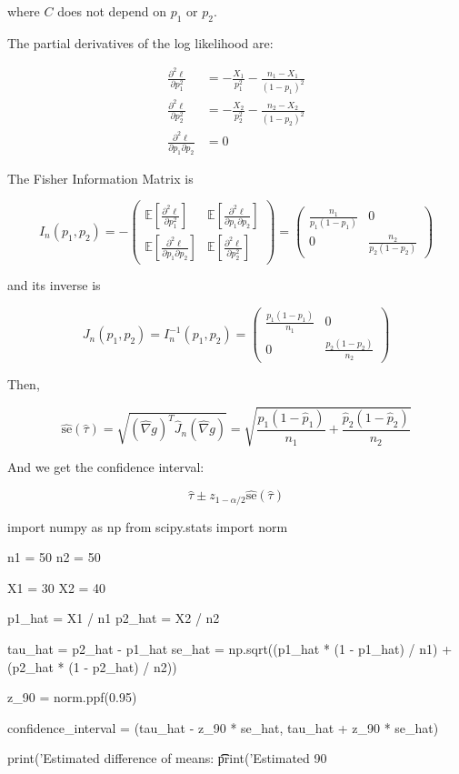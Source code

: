 where \(C\) does not depend on \(p_{1}\) or \(p_{2}\).

The partial derivatives of the log likelihood are:

\begin{align*}
\frac{\partial^{2} \ell}{\partial p_{1}^{2}} & = - \frac{X_{1}}{p_{1}^{2}} - \frac{n_{1} - X_{1}}{(1 - p_{1})^{2}} \\
\frac{\partial^{2} \ell}{\partial p_{2}^{2}} & = - \frac{X_{2}}{p_{2}^{2}} - \frac{n_{2} - X_{2}}{(1 - p_{2})^{2}} \\
\frac{\partial^{2} \ell}{\partial p_{1} \partial p_{2}} & = 0
\end{align*}

The Fisher Information Matrix is

\[ I_{n}(p_{1}, p_{2}) = -\begin{pmatrix}
\mathbb{E}\left[ \frac{\partial^{2} \ell}{\partial p_{1}^{2}} \right]
& \mathbb{E}\left[ \frac{\partial^{2} \ell}{\partial p_{1} \partial p_{2}} \right]  \\
\mathbb{E}\left[ \frac{\partial^{2} \ell}{\partial p_{1} \partial p_{2}} \right]
& \mathbb{E}\left[ \frac{\partial^{2} \ell}{\partial p_{2}^{2}} \right]
\end{pmatrix} = \begin{pmatrix}
\frac{n_{1}}{p_{1}(1 - p_{1})} & 0 \\
0 & \frac{n_{2}}{p_{2}(1 - p_{2})}
\end{pmatrix}\]

and its inverse is

\[J_{n}(p_{1}, p_{2}) = I_{n}^{-1}(p_{1}, p_{2}) = \begin{pmatrix} 
\frac{p_{1}(1 - p_{1})}{n_{1}} & 0 \\
0 & \frac{p_{2}(1 - p_{2})}{n_{2}}
\end{pmatrix}\]

Then,

\[\hat{\text{se}}(\hat{\tau}) = \sqrt{(\hat{\nabla}g)^T \hat{J}_{n} (\hat{\nabla}g)}
= \sqrt{\frac{\hat{p}_{1}(1 - \hat{p}_{1})}{n_{1}} + \frac{\hat{p}_{2}(1 - \hat{p}_{2})}{n_{2}}}
\]

And we get the confidence interval:

\[ \hat{\tau} \pm z_{1 - \alpha/2}\hat{\text{se}}(\hat{\tau})\]

\begin{python}
import numpy as np
from scipy.stats import norm

n1 = 50
n2 = 50

X1 = 30
X2 = 40

p1_hat = X1 / n1
p2_hat = X2 / n2

tau_hat = p2_hat - p1_hat
se_hat = np.sqrt((p1_hat * (1 - p1_hat) / n1) + (p2_hat * (1 - p2_hat) / n2))

z_90 = norm.ppf(0.95)

confidence_{i}nterval = (tau_hat - z_90 * se_hat, tau_hat + z_90 * se_hat)

print('Estimated difference of means: \t\t %
print('Estimated 90%
\end{python}

